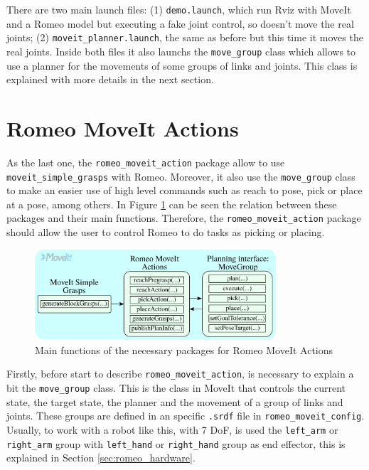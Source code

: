 \documentclass[12pt,a4paper,final,twoside,openright]{report}
\begin{document}
There are two main launch files: (1) \texttt{demo.launch}, which run Rviz with MoveIt and a Romeo model but executing a fake joint control, so doesn't move the real joints; (2) \texttt{moveit\_planner.launch}, the same as before but this time it moves the real joints. Inside both files it also launchs the \texttt{move\_group} class which allows to use a planner for the movements of some groups of links and joints. This class is explained with more details in the next section.

\section{Romeo MoveIt Actions}
\label{sec:romeo_moveit_actions}

As the last one, the \texttt{romeo\_moveit\_action} package allow to use \texttt{moveit\_simple\_grasps} with Romeo. Moreover, it also use the \texttt{move\_group} class to make an easier use of high level commands such as reach to pose, pick or place at a pose, among others. In Figure \ref{fig:moveit_internal} can be seen the relation between these packages and their main functions. Therefore, the \texttt{romeo\_moveit\_action} package should allow the user to control Romeo to do tasks as picking or placing.

\begin{figure}[h]
\centering
\includegraphics[width=0.8\textwidth]{images/moveit_internal.eps}
\caption{Main functions of the necessary packages for Romeo MoveIt Actions\label{fig:moveit_internal}}
\end{figure}

Firstly, before start to describe \texttt{romeo\_moveit\_action}, is necessary to explain a bit the \texttt{move\_group} class. This is the class in MoveIt that controls the current state, the target state, the planner and the movement of a group of links and joints. These groups are defined in an specific \texttt{.srdf} file in \texttt{romeo\_moveit\_config}. Usually, to work with a robot like this, with 7 DoF, is used the \texttt{left\_arm} or \texttt{right\_arm} group with \texttt{left\_hand} or \texttt{right\_hand} group as end effector, this is explained in Section \ref{sec:romeo_hardware}.
\end{document}
